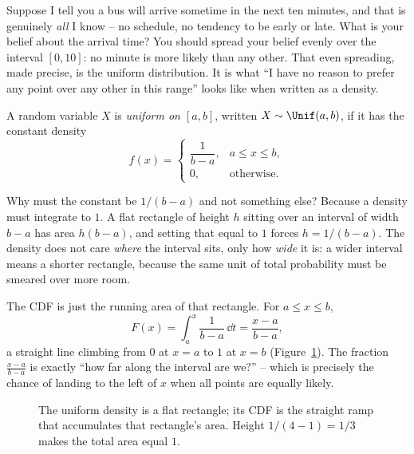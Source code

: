 \begin{intuitionbox}
Suppose I tell you a bus will arrive sometime in the next ten minutes, and that
is genuinely \emph{all} I know -- no schedule, no tendency to be early or late.
What is your belief about the arrival time? You should spread your belief evenly
over the interval $[0,10]$: no minute is more likely than any other. That even
spreading, made precise, is the uniform distribution. It is what ``I have no
reason to prefer any point over any other in this range'' looks like when
written as a density.
\end{intuitionbox}

\begin{definition}
\label{ch11:def-uniform}
A random variable $X$ is \emph{uniform on $[a,b]$}, written
$X \sim \Unif(a,b)$, if it has the constant density
\[
  f(x) = \begin{cases} \dfrac{1}{b-a}, & a \le x \le b, \\[4pt] 0, & \text{otherwise.}\end{cases}
\]
\end{definition}

Why must the constant be $1/(b-a)$ and not something else? Because a density
must integrate to $1$. A flat rectangle of height $h$ sitting over an interval
of width $b-a$ has area $h(b-a)$, and setting that equal to $1$ forces
$h = 1/(b-a)$. The density does not care \emph{where} the interval sits, only
how \emph{wide} it is: a wider interval means a shorter rectangle, because the
same unit of total probability must be smeared over more room.

The CDF is just the running area of that rectangle. For $a \le x \le b$,
\[
  F(x) = \int_a^x \frac{1}{b-a}\,\dd t = \frac{x-a}{b-a},
\]
a straight line climbing from $0$ at $x=a$ to $1$ at $x=b$ (Figure~\ref{ch11:fig-uniform}).
The fraction $\tfrac{x-a}{b-a}$ is exactly ``how far along the interval are we?''
-- which is precisely the chance of landing to the left of $x$ when all points
are equally likely.

\begin{figure}[H]
\centering
{}
\caption{The uniform density is a flat rectangle; its CDF is the straight ramp
that accumulates that rectangle's area. Height $1/(4-1)=1/3$ makes the total
area equal $1$.}
\label{ch11:fig-uniform}
\end{figure}

